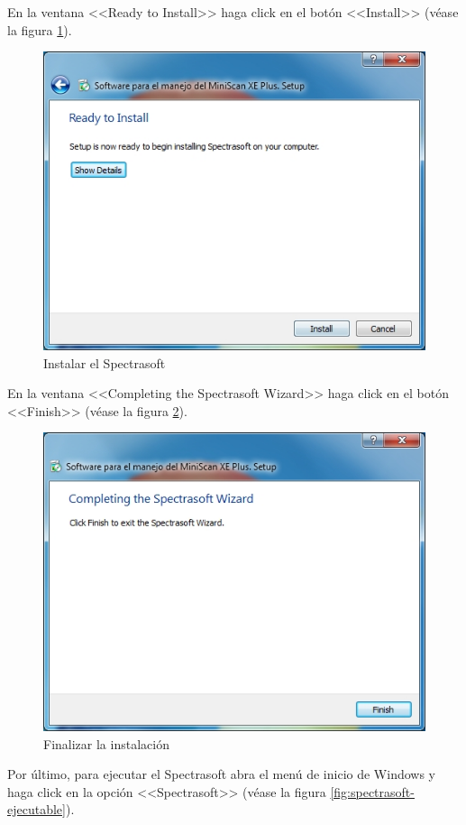 \newpage

En la ventana <<Ready to Install>> haga click en el bot\'{o}n <<Install>> (v\'{e}ase la figura \ref{fig:spectrasoft-instalar}).

\begin{figure}[H]
  \centering
  \includegraphics[width=.6\linewidth]{./img/spectrasoft-instalar.jpg}
\caption[]{Instalar el Spectrasoft\label{fig:spectrasoft-instalar}}
\end{figure}

En la ventana <<Completing the Spectrasoft Wizard>> haga click en el bot\'{o}n <<Finish>> (v\'{e}ase la figura \ref{fig:spectrasoft-finalizar}).

\begin{figure}[H]
  \centering
  \includegraphics[width=.6\linewidth]{./img/spectrasoft-finalizar.jpg}
\caption[]{Finalizar la instalaci\'{o}n\label{fig:spectrasoft-finalizar}}
\end{figure}

\newpage

Por \'{u}ltimo, para ejecutar el Spectrasoft abra el men\'{u} de inicio de Windows y haga click en la opci\'{o}n <<Spectrasoft>> (v\'{e}ase la figura \ref{fig:spectrasoft-ejecutable}).

